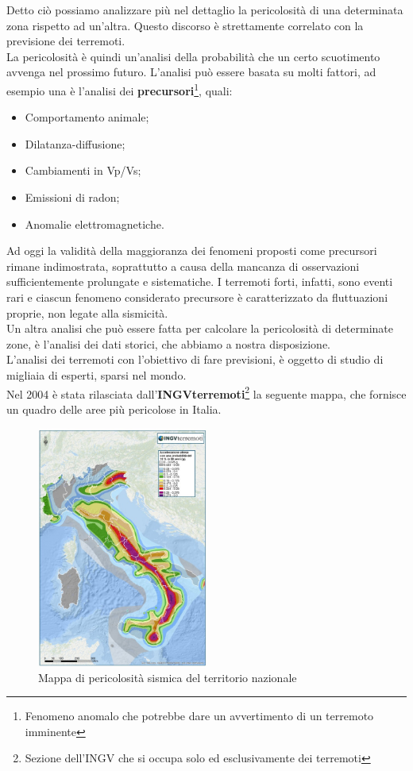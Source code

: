 Detto ci\`o possiamo analizzare pi\`u nel dettaglio la pericolosit\`a di una determinata zona rispetto ad un'altra. Questo discorso \`e strettamente correlato con la previsione dei terremoti.\\
La pericolosit\`a \`e quindi un'analisi della probabilit\`a che un certo scuotimento avvenga nel prossimo futuro. L'analisi pu\`o essere basata su molti fattori, ad esempio una \`e l'analisi dei \textbf{precursori}\footnote{Fenomeno anomalo che potrebbe dare un avvertimento di un terremoto imminente}, quali:
\begin{itemize}
    \item Comportamento animale;
    \item Dilatanza-diffusione;
    \item Cambiamenti in V\ped p/V\ped s;
    \item Emissioni di radon;
    \item Anomalie elettromagnetiche.
\end{itemize}
Ad oggi la validit\`a della maggioranza dei fenomeni proposti come precursori rimane indimostrata, soprattutto a causa della mancanza di osservazioni sufficientemente prolungate e sistematiche. I terremoti forti, infatti, sono eventi rari e ciascun fenomeno considerato precursore \`e caratterizzato da fluttuazioni proprie, non legate alla sismicit\`a.\\
Un altra analisi che pu\`o essere fatta per calcolare la pericolosit\`a di determinate zone, \`e l'analisi dei dati storici, che abbiamo a nostra disposizione.\\
L'analisi dei terremoti con l'obiettivo di fare previsioni, \`e oggetto di studio di migliaia di esperti, sparsi nel mondo.\\
Nel 2004 \`e stata rilasciata dall'\textbf{INGVterremoti}\footnote{Sezione dell'INGV che si occupa solo ed esclusivamente dei terremoti} la seguente mappa, che fornisce un quadro delle aree pi\`u pericolose in Italia.
\begin{figure}[H]
   \centering
   \includegraphics[width=0.5\textwidth]{images/mappaPericolosita.jpg}
   \caption{Mappa di pericolosit\`a sismica del territorio nazionale}
   \label{img:mappaPericolo}
\end{figure}
